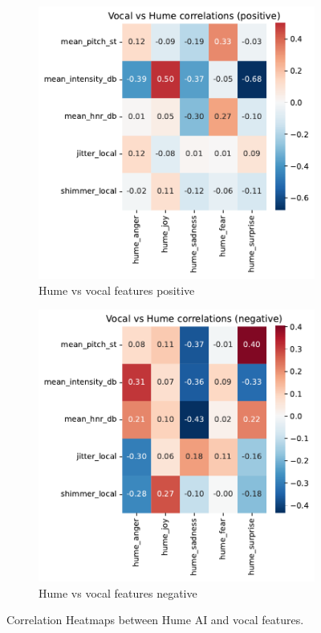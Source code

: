 \begin{figure}[!h]
    \centering 
    \begin{subfigure}[b]{0.45\textwidth}
        \includegraphics[width=\textwidth]{png/results/rq1_nr3/vocal_vs_hume_correlations_positive.png.pdf}
        \caption{Hume vs vocal features positive}
        \label{fig:hume_vocal_positive}
    \end{subfigure}
    \begin{subfigure}[b]{0.45\textwidth}
        \includegraphics[width=\textwidth]{png/results/rq1_nr3/vocal_vs_hume_correlations_negative.png.pdf}
        \caption{Hume vs vocal features negative}        
        \label{fig:hume_vocal_negative}
    \end{subfigure}   
    \caption{Correlation Heatmaps between Hume AI and vocal features.}
    \label{fig:rq1-heatmaps}     
\end{figure}
